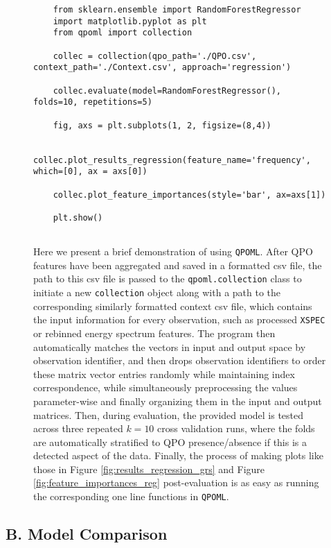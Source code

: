 \documentclass[fleqn,usenatbib,twocolumn]{mnras}%
\begin{document}
\begin{figure}
    \centering
    
    \begin{verbatim}
    from sklearn.ensemble import RandomForestRegressor
    import matplotlib.pyplot as plt 
    from qpoml import collection
    
    collec = collection(qpo_path='./QPO.csv', context_path='./Context.csv', approach='regression')
                        
    collec.evaluate(model=RandomForestRegressor(), folds=10, repetitions=5)

    fig, axs = plt.subplots(1, 2, figsize=(8,4))

    collec.plot_results_regression(feature_name='frequency', which=[0], ax = axs[0])
                                   
    collec.plot_feature_importances(style='bar', ax=axs[1])
                                    
    plt.show()
    
    \end{verbatim}
    \caption{Here we present a brief demonstration of using \texttt{QPOML}. After QPO features have been aggregated and saved in a formatted csv file, the path to this csv file is passed to the \texttt{qpoml.collection} class to initiate a new \texttt{collection} object along with a path to the corresponding similarly formatted context csv file, which contains the input information for every observation, such as processed \texttt{XSPEC} or rebinned energy spectrum features. The program then automatically matches the vectors in input and output space by observation identifier, and then drops observation identifiers to order these matrix vector entries randomly while maintaining index correspondence, while simultaneously preprocessing the values parameter-wise and finally organizing them in the input and output matrices. Then, during evaluation, the provided model is tested across three repeated $k=10$ cross validation runs, where the folds are automatically stratified to QPO presence/absence if this is a detected aspect of the data. Finally, the process of making plots like those in Figure \ref{fig:results_regression_grs} and Figure \ref{fig:feature_importances_reg} post-evaluation is as easy as running the corresponding one line functions in \texttt{QPOML}.}
    \label{fig:QPOML-DEMO}
\end{figure}

\newpage
\subsection*{B. Model Comparison} \label{appendix:B}
\end{document}
